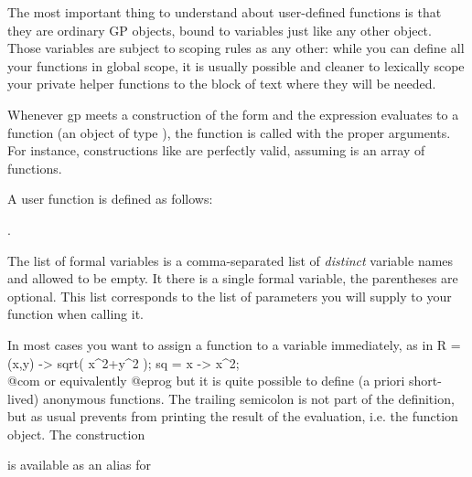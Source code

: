 The most important thing to understand about user-defined functions is
that they are ordinary GP objects, bound to variables just like any
other object. Those variables are subject to scoping rules as any other:
while you can define all your functions in global scope, it is usually
possible and cleaner to lexically scope your private helper functions to the
block of text where they will be needed.

Whenever gp meets a construction of the form 
and the expression  evaluates to a function (an object of type
), the function is called with the proper arguments. For
instance, constructions like  are perfectly valid,
assuming  is an array of functions.

\label{se:userfundef}

A user function is defined as follows:

  .

\noindent The list of formal variables is a comma-separated list of
\emph{distinct} variable names and allowed to be empty. It there is a single
formal variable, the parentheses are optional. This list corresponds to the
list of parameters you will supply to your function when calling it.

In most cases you want to assign a function to a variable immediately, as in
\bprog
R = (x,y) -> sqrt( x^2+y^2 );
sq = x -> x^2;  \\@com or equivalently 
@eprog\noindent
but it is quite possible to define (a priori short-lived) anonymous functions.
The trailing semicolon is not part of the definition, but as usual prevents
 from printing the result of the evaluation, i.e. the function
object. The construction


\noindent is available as an alias for


